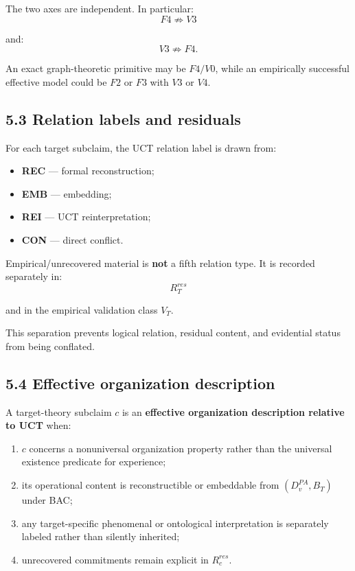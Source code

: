 \documentclass[
  11pt,
  a4paper,
]{article}
\providecommand{\tightlist}{%
  \setlength{\itemsep}{0pt}\setlength{\parskip}{0pt}}
\begin{document}
The two axes are independent. In particular:
\nopagebreak[4]
\[
F4\not\Rightarrow V3
\]

and:
\nopagebreak[4]
\[
V3\not\Rightarrow F4.
\]

An exact graph-theoretic primitive may be \(F4/V0\), while an
empirically successful effective model could be \(F2\) or \(F3\) with
\(V3\) or \(V4\).

\hypertarget{relation-labels-and-residuals}{%
\subsection{5.3 Relation labels and
residuals}\label{relation-labels-and-residuals}}

For each target subclaim, the UCT relation label is drawn from:

\begin{itemize}
\tightlist
\item
  \textbf{REC} --- formal reconstruction;
\item
  \textbf{EMB} --- embedding;
\item
  \textbf{REI} --- UCT reinterpretation;
\item
  \textbf{CON} --- direct conflict.
\end{itemize}

Empirical/unrecovered material is \textbf{not} a fifth relation type. It
is recorded separately in:
\nopagebreak[4]
\[
R_T^{res}
\]

and in the empirical validation class \(V_T\).

This separation prevents logical relation, residual content, and
evidential status from being conflated.

\hypertarget{effective-organization-description}{%
\subsection{5.4 Effective organization
description}\label{effective-organization-description}}

A target-theory subclaim \(c\) is an \textbf{effective organization
description relative to UCT} when:

\begin{enumerate}
\def\labelenumi{\arabic{enumi}.}
\tightlist
\item
  \(c\) concerns a nonuniversal organization property rather than the
  universal existence predicate for experience;
\item
  its operational content is reconstructible or embeddable from
  \((D^{PA}_v,B_T)\) under BAC;
\item
  any target-specific phenomenal or ontological interpretation is
  separately labeled rather than silently inherited;
\item
  unrecovered commitments remain explicit in \(R_c^{res}\).
\end{enumerate}
\end{document}
